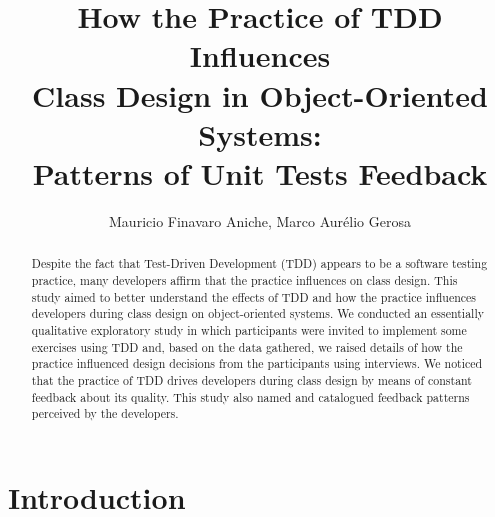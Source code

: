 \documentclass[times]{speauth}
\begin{document}

\title{How the Practice of TDD Influences \\Class Design in Object-Oriented Systems: \\Patterns of Unit Tests Feedback}

\author{Mauricio Finavaro Aniche, Marco Aurélio Gerosa}

\address{
	Department of Computer Sciences\\ 
	Institute of Mathematics and Statistics\\ 
	University of São Paulo (USP)\\ 
	PO Box 66.281 - 05.508-090 - São Paulo - SP - Brazil\\
}

\begin{abstract}

	Despite the fact that Test-Driven Development (TDD) appears to be a software testing practice, 
	many developers affirm that the practice influences on class design. This study aimed
	to better understand the effects of TDD and how the practice influences developers
	during class design on object-oriented systems. 
	We conducted an essentially qualitative exploratory study in which participants
	were invited to implement some exercises using TDD and, based on the data gathered,
	we raised details of how the practice influenced design decisions from the
	participants using interviews.
	We noticed that the practice of TDD drives
	developers during class design by means of constant feedback about its quality. This study
	also named and catalogued feedback patterns perceived by the developers.
	
\end{abstract}


\maketitle

\vspace{-6pt}

\section{Introduction}
\end{document}
